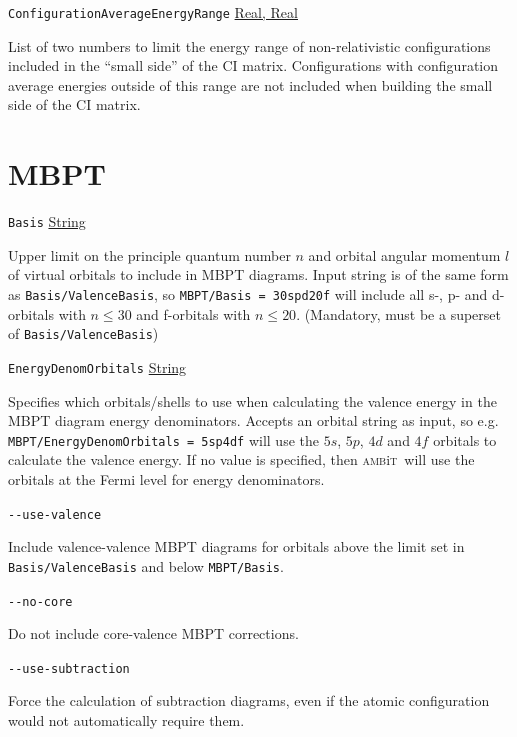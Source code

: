 \documentclass{report}
\newcommand{\ambit}{\textsc{amb}{\footnotesize i}\textsc{t}}
\begin{document}
\texttt{ConfigurationAverageEnergyRange} \uline{Real, Real}
\begin{adjustwidth}{1cm}{}
List of two numbers to limit the energy range of non-relativistic configurations included in the ``small
side'' of the CI matrix.
Configurations with configuration average energies outside of this range are not included when building
the small side of the CI matrix.
\end{adjustwidth}

\section{MBPT}

\texttt{Basis} \uline{String}
\begin{adjustwidth}{1cm}{}
Upper limit on the principle quantum number $n$ and orbital angular momentum $l$ of
virtual orbitals to include in MBPT diagrams. Input string is of the same form as
\texttt{Basis/ValenceBasis}, so \texttt{MBPT/Basis = 30spd20f} will include all s-, p- and d-orbitals
with $n \leq 30$ and f-orbitals with $n \leq 20$. (Mandatory, must be a superset of
\texttt{Basis/ValenceBasis})
\end{adjustwidth}

\texttt{EnergyDenomOrbitals} \uline{String}
\begin{adjustwidth}{1cm}{}
Specifies which orbitals/shells to use when calculating the valence energy
in the MBPT diagram energy denominators. Accepts an orbital string as input, so e.g. 
\texttt{MBPT/EnergyDenomOrbitals = 5sp4df} will use the $5s$, $5p$, $4d$ and $4f$ orbitals to calculate
the valence energy. If no value is specified, then \ambit\ will use the orbitals at the Fermi level for
energy denominators.
\end{adjustwidth}

\texttt{{-}{-}use-valence}
\begin{adjustwidth}{1cm}{}
Include valence-valence MBPT diagrams for orbitals above the limit set in \texttt{Basis/ValenceBasis} 
and below \texttt{MBPT/Basis}.
\end{adjustwidth}

\texttt{{-}{-}no-core}
\begin{adjustwidth}{1cm}{}
Do not include core-valence MBPT corrections.
\end{adjustwidth}

\texttt{{-}{-}use-subtraction}
\begin{adjustwidth}{1cm}{}
Force the calculation of subtraction diagrams, even if the atomic configuration would not automatically
require them.
\end{adjustwidth}
\end{document}

